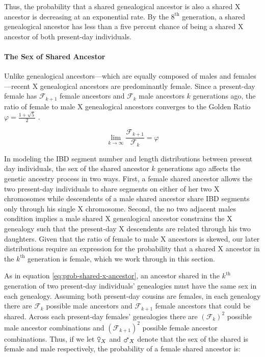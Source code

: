 \documentclass[9pt,twocolumn,twoside]{gsajnl}
\newcommand{\msxa}{\mars_X}
\newcommand{\fsxa}{\venus_X}
\begin{document}
Thus, the probability that a shared genealogical ancestor is also a shared X
ancestor is decreasing at an exponential rate. By the $8^\text{th}$ generation,
a shared genealogical ancestor has less than a five percent chance of being a
shared X ancestor of both present-day individuals.

\paragraph{The Sex of Shared Ancestor}
\label{p:sex-of-shared-ancestor}

Unlike genealogical ancestors---which are equally composed of males and
females---recent X genealogical ancestors are predominantly female. Since a
present-day female has $\mathcal{F}_{k+1}$ female ancestors and
$\mathcal{F}_{k}$ male ancestors $k$ generations ago, the ratio of female to
male X genealogical ancestors converges to the Golden Ratio $\varphi = \frac{1
+ \sqrt{5}}{2}$ \citep{simson1753explication}.

\begin{equation}
  \lim_{k \to \infty} \frac{\mathcal{F}_{k+1}}{\mathcal{F}_k} = \varphi
\end{equation}

In modeling the IBD segment number and length distributions between present day
individuals, the sex of the shared ancestor $k$ generations ago affects the
genetic ancestry process in two ways. First, a female shared ancestor allows
the two present-day individuals to share segments on either of her two X
chromosomes while descendents of a male shared ancestor share IBD segments only
through his single X chromosome. Second, the no two adjacent males condition
implies a male shared X genealogical ancestor constrains the X genealogy such
that the present-day X descendents are related through his two daughters.
Given that the ratio of female to male X ancestors is skewed, our later
distributions require an expression for the probability that a shared X
ancestor in the $k^\text{th}$ generation is female, which we work through in
this section.

As in equation \eqref{eq:prob-shared-x-ancestor}, an ancestor shared in the
$k^\text{th}$ generation of two present-day individuals' genealogies must have
the same sex in each genealogy. Assuming both present-day cousins are females,
in each genealogy there are $\mathcal{F}_k$ possible male ancestors and
$\mathcal{F}_{k+1}$ female ancestors that could be shared. Across each
present-day females' genealogies there are $(\mathcal{F}_k)^2$ possible male
ancestor combinations and $(\mathcal{F}_{k+1})^2$ possible female ancestor
combinations. Thus, if we let $\fsxa$ and $\msxa$ denote that the sex of the
shared is female and male respectively, the probability of a female shared
ancestor is: 
\end{document}
